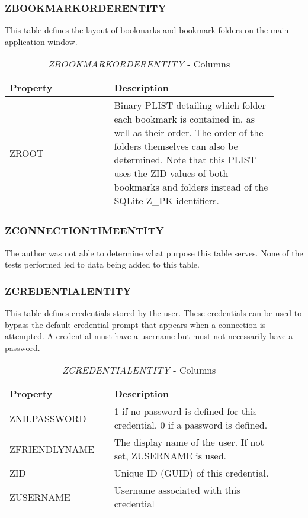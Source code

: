 \documentclass[journal]{IEEEtran}
\begin{document}
\subsubsection{ZBOOKMARKORDERENTITY}

This table defines the layout of bookmarks and bookmark folders on the main application window.

\begin{table}[h!]
\caption{\textit{ZBOOKMARKORDERENTITY} - Columns}
\begin{tabular}{p{0.35\linewidth} | p{0.55\linewidth}}
Property              & Description                                                                                           \\ \hline
ZROOT                & 
Binary PLIST detailing which folder each bookmark is contained in, as well as their order. The order of the folders themselves can also be determined. Note that this PLIST uses the ZID values of both bookmarks and folders instead of the SQLite Z\_PK identifiers.
\end{tabular}
\end{table}

\subsubsection{ZCONNECTIONTIMEENTITY}

The author was not able to determine what purpose this table serves. None of the tests performed led to data being added to this table.\\

\subsubsection{ZCREDENTIALENTITY}

This table defines credentials stored by the user. These credentials can be used to bypass the default credential prompt that appears when a connection is attempted. A credential must have a username but must not necessarily have a password.

\begin{table}[h!]
\caption{\textit{ZCREDENTIALENTITY} - Columns}
\begin{tabular}{p{0.35\linewidth} | p{0.55\linewidth}}
Property      & Description                                                                  \\ \hline
ZNILPASSWORD  & 1 if no password is defined for this credential, 0 if a password is defined. \\
ZFRIENDLYNAME & The display name of the user. If not set, ZUSERNAME is used.                 \\
ZID           & Unique ID (GUID) of this credential.                                         \\
ZUSERNAME     & Username associated with this credential                                    
\end{tabular}
\end{table}
\end{document}
